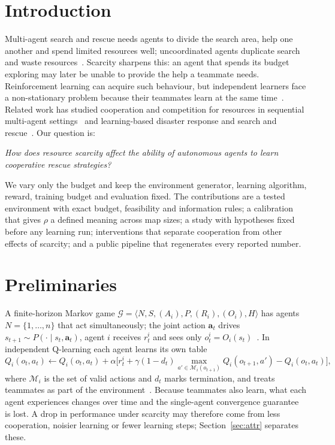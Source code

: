 \documentclass{article}
\begin{document}
\section{Introduction}
Multi-agent search and rescue needs agents to divide the search area, help one another and spend limited resources
well; uncoordinated agents duplicate search and waste resources~\cite{shoham2008,queralta2020}. Scarcity sharpens this:
an agent that spends its budget exploring may later be unable to provide the help a teammate needs. Reinforcement
learning can acquire such behaviour, but independent learners face a non-stationary problem because their teammates
learn at the same time~\cite{zhang2021,tan1993}. Related work has studied cooperation and competition for resources in
sequential multi-agent settings~\cite{leibo2017} and learning-based disaster response and search and
rescue~\cite{nguyen2018,hickling2026}. Our question is:
\begin{center}
\emph{How does resource scarcity affect the ability of autonomous agents to learn cooperative rescue strategies?}
\end{center}
We vary only the budget and keep the environment generator, learning algorithm, reward, training budget and evaluation
fixed. The contributions are a tested environment with exact budget, feasibility and information rules; a calibration
that gives $\rho$ a defined meaning across map sizes; a study with hypotheses fixed before any learning run; interventions
that separate cooperation from other effects of scarcity; and a public pipeline that regenerates every reported number.

\section{Preliminaries}
A finite-horizon Markov game
$\mathcal{G}=\langle N,S,(A_i),P,(R_i),(O_i),H\rangle$ has agents $N=\{1,\dots,n\}$ that act simultaneously; the joint
action $\mathbf{a}_t$ drives $s_{t+1}\sim P(\cdot\mid s_t,\mathbf{a}_t)$, agent $i$ receives $r^i_t$ and sees only
$o^i_t=O_i(s_t)$~\cite{shoham2008}. In independent Q-learning each agent learns its own table~\cite{watkins1992,sutton2018}
\begin{equation}
Q_i(o_t,a_t)\leftarrow Q_i(o_t,a_t)+\alpha\Big[r^i_t+\gamma(1-d_t)\max_{a'\in\mathcal{M}_i(o_{t+1})}Q_i(o_{t+1},a')-Q_i(o_t,a_t)\Big],
\end{equation}
where $\mathcal{M}_i$ is the set of valid actions and $d_t$ marks termination, and treats teammates as part of the
environment~\cite{tan1993}. Because teammates also learn, what each agent experiences changes over time and the
single-agent convergence guarantee is lost. A drop in performance under scarcity may therefore come from less
cooperation, noisier learning or fewer learning steps; Section~\ref{sec:attr} separates these.
\end{document}
